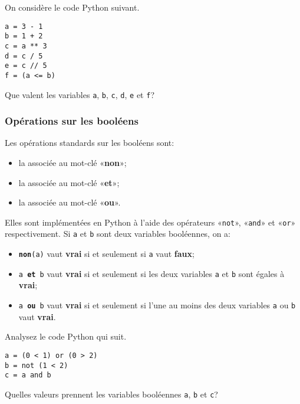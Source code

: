 \newpage

\begin{exercise}
	On considère le code Python suivant.
	\begin{center}
		\begin{varwidth}[t]{.5\textwidth}
			\begin{lstlisting}[language=iPython,linewidth = 4cm]
a = 3 - 1
b = 1 + 2
c = a ** 3
d = c / 5
e = c // 5
f = (a <= b)\end{lstlisting}\end{varwidth}\end{center}
Que valent les variables \texttt{a}, \texttt{b}, \texttt{c}, \texttt{d}, \texttt{e} et \texttt{f}?
\end{exercise}

\subsubsection{Opérations sur les booléens}

Les opérations standards sur les booléens sont:
\begin{itemize}
	\item la  associée au mot-clé «{\ttfamily\bf non}»;
	\item la  associée au mot-clé «{\ttfamily\bf et}»;
	\item la  associée au mot-clé «{\ttfamily\bf ou}».
\end{itemize}
Elles sont implémentées en Python à l'aide des opérateurs «\texttt{not}», «\texttt{and}» et «\texttt{or}» respectivement.
Si \texttt{a} et \texttt{b} sont deux variables booléennes, on a:
\begin{itemize}
	\item \texttt{{\bf non}(a)} vaut {\ttfamily\bf vrai} si et seulement si \texttt{a} vaut {\ttfamily\bf faux};
	\item \texttt{a {\bf et} b} vaut {\ttfamily\bf vrai} si et seulement si les deux variables \texttt{a} et \texttt{b} sont égales à {\ttfamily\bf vrai};
	\item \texttt{a {\bf ou} b} vaut {\ttfamily\bf vrai} si et seulement si l'une au moins des deux variables \texttt{a} ou \texttt{b} vaut {\ttfamily\bf vrai}.
\end{itemize}

\begin{exercise}
	Analysez le code Python qui suit.
	\begin{center}
		\begin{varwidth}[t]{.5\textwidth}
			\begin{lstlisting}[language=iPython,linewidth = 6cm]
a = (0 < 1) or (0 > 2)
b = not (1 < 2)
c = a and b
\end{lstlisting}\end{varwidth}\end{center}
	Quelles valeurs prennent les variables booléennes \texttt{a}, \texttt{b} et \texttt{c}?
\end{exercise}

